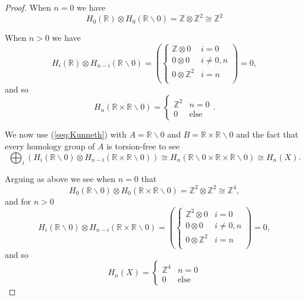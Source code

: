 \documentclass{article}
\begin{document}
\begin{enumerate}
\begin{proof}
		When $n =0$ we have 
		\[H_0 (\mathbb{R}) \otimes H_0 (\mathbb{R} \backslash 0) = \mathbb{Z} \otimes \mathbb{Z}^2 \cong \mathbb{Z}^2\]
		
		When $n>0$ we have 
		\[ H_i(\mathbb{R}) \otimes H_{n-i}(\mathbb{R}\backslash 0) = \left (\begin{cases} 
			\mathbb{Z} \otimes 0 & i=0\\  
			0 \otimes 0 & i \neq 0,n\\
			0 \otimes \mathbb{Z}^2 & i = n\\
			\end{cases} \right) = 0 ,\]
		and so
		\[H_{n}( \mathbb{R} \times \mathbb{R}\backslash 0) = \begin{cases} \mathbb{Z}^2 & n=0 \\ 0 &\text{else} \end{cases}.\]
		
		We now use (\ref{seq:Kunneth}) with $A = \mathbb{R} \backslash 0$ and $B = \mathbb{R} \times \mathbb{R} \backslash 0$ and the fact that every homology group of $A$ is torsion-free to see
		\[ \bigoplus_i \left ( H_i(\mathbb{R} \backslash 0) \otimes H_{n-i}(\mathbb{R} \times \mathbb{R}\backslash 0) \right ) \cong H_n(\mathbb{R} \backslash 0 \times\mathbb{R}\times \mathbb{R}\backslash 0) \cong H_n(X).\]
		
		Arguing as above we see when $n=0$ that
		\[ H_0(\mathbb{R} \backslash 0) \otimes H_0(\mathbb{R} \times \mathbb{R}\backslash 0) = \mathbb{Z}^2 \otimes \mathbb{Z}^2 \cong \mathbb{Z}^4,\]
		and 
		for $n >0$ 
		\[ H_i(\mathbb{R} \backslash 0 ) \otimes H_{n-i}(\mathbb{R} \times \mathbb{R}\backslash 0) = \left (\begin{cases} 
			\mathbb{Z}^2 \otimes 0 & i=0\\  
			0 \otimes 0 & i \neq 0,n\\
			0 \otimes \mathbb{Z}^2 & i = n\\
			\end{cases} \right) = 0 ,\]
		and so 
		\[ H_n(X) = \begin{cases} \mathbb{Z}^4 & n=0 \\ 0 & \text{else} \end{cases}\]
	\end{proof}
	
\end{enumerate}
\end{document}
